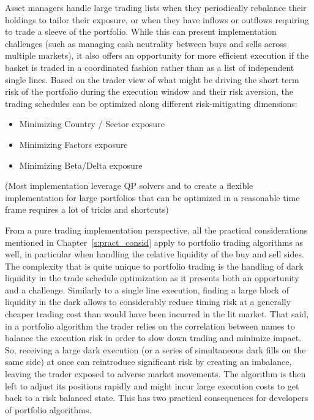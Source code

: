 Asset managers handle large trading lists when they periodically rebalance their holdings to tailor their exposure, or when they have inflows or outflows requiring to trade a sleeve of the portfolio. While this can present implementation challenges (such as managing cash neutrality between buys and sells across multiple markets), it also offers an opportunity for more efficient execution if the basket is traded in a coordinated fashion rather than as a list of independent single lines. Based on the trader view of what might be driving the short term risk of the portfolio during the execution window and their risk aversion, the trading schedules can be optimized along different risk-mitigating dimensions:

        \begin{itemize}
        \item Minimizing Country / Sector exposure
        \item Minimizing Factors exposure
        \item Minimizing Beta/Delta exposure
        \end{itemize}

(Most implementation leverage QP solvers and to create a flexible implementation for large portfolios that can be optimized in a reasonable time frame requires a lot of tricks and shortcuts)


From a pure trading implementation perspective, all the practical considerations mentioned in Chapter~\ref{s:pract_consid} apply to portfolio trading algorithms as well, in particular when handling the relative liquidity of the buy and sell sides. The complexity that is quite unique to portfolio trading is the handling of dark liquidity in the trade schedule optimization as it presents both an opportunity and a challenge. Similarly to a single line execution, finding a large block of liquidity in the dark allows to considerably reduce timing risk at a generally cheaper trading cost than would have been incurred in the lit market. That said, in a portfolio algorithm the trader relies on the correlation between names to balance the execution risk in order to slow down trading and minimize impact. So, receiving a large dark execution (or a series of simultaneous dark fills on the same side) at once can reintroduce significant risk by creating an imbalance, leaving the trader exposed to adverse market movements. The algorithm is then left to adjust its positions rapidly and might incur large execution costs to get back to a risk balanced state. This has two practical consequences for developers of portfolio algorithms. 


